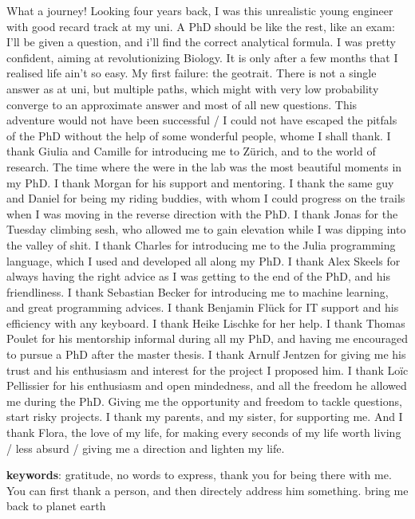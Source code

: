 %
\label{sec:acknowledgement}


What a journey! Looking four years back, I was this unrealistic young engineer with good recard track at my uni. A PhD should be like the rest, like an exam: I'll be given a question, and i'll find the correct analytical formula. 
%
I was pretty confident, aiming at revolutionizing Biology. It is only after a few months that I realised life ain't so easy.
% 
My first failure: the geotrait. There is not a single answer as at uni, but multiple paths, which might with very low probability converge to an approximate answer and most of all new questions.
% 
This adventure would not have been successful / I could not have escaped the pitfals of the PhD without the help of some wonderful people, whome I shall thank.
% 
I thank Giulia and Camille for introducing me to Zürich, and to the world of research. The time where the were in the lab was the most beautiful moments in my PhD.
% 
I thank Morgan for his support and mentoring. I thank the same guy and Daniel for being my riding buddies, with whom I could progress on the trails when I was moving in the reverse direction with the PhD.
% 
I thank Jonas for the Tuesday climbing sesh, who allowed me to gain elevation while I was dipping into the valley of shit.
% 
I thank Charles for introducing me to the Julia programming language, which I used and developed all along my PhD. 
% 
I thank Alex Skeels for always having the right advice as I was getting to the end of the PhD, and his friendliness.
% 
I thank Sebastian Becker for introducing me to machine learning, and great programming advices.
% 
I thank Benjamin Flück for IT support and his efficiency with any keyboard.
% 
I thank Heike Lischke for her help.
% 
I thank Thomas Poulet for his mentorship informal during all my PhD, and having me encouraged to pursue a PhD after the master thesis.
% 
I thank Arnulf Jentzen for giving me his trust and his enthusiasm and interest for the project I proposed him. 
% 
I thank Loïc Pellissier for his enthusiasm and open mindedness, and all the freedom he allowed me during the PhD. Giving me the opportunity and freedom to tackle questions, start risky projects.
% 
I thank my parents, and my sister, for supporting me.
% 
And I thank Flora, the love of my life, for making every seconds of my life worth living / less absurd / giving me a direction and lighten my life.

\textbf{keywords}: gratitude, no words to express, thank you for being there with me. You can first thank a person, and then directely address him something. bring me back to planet earth


\begin{comment}
    some nice phrasing:
    I express my gratitude to xxx
    I am thankful to xxx
\end{comment}